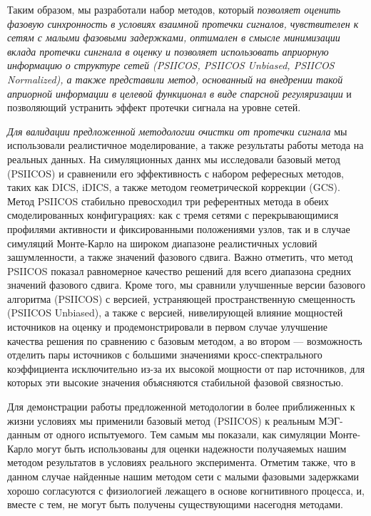 Таким образом, мы разработали набор методов, который \emph{позволяет оценить
    фазовую синхронность в условиях взаимной протечки сигналов, чувствителен к
    сетям с малыми фазовыми задержками, оптимален в смысле минимизации вклада
    протечки сингнала в оценку и позволяет использовать априорную информацию о
    структуре сетей (PSIICOS, PSIICOS Unbiased, PSIICOS Normalized), а также
    представили метод, основанный на внедрении такой априорной информации в
целевой функционал в виде спарсной регуляризации} и позволяющий устранить
эффект протечки сигнала на уровне сетей.

\emph{Для валидации предложенной методологии очистки от протечки сигнала} мы
использовали реалистичное моделирование, а также результаты работы метода на реальных данных.
На симуляционных даннх мы исследовали базовый метод
(PSIICOS) и сравненили его эффективность с набором рефересных методов, таких как
DICS, iDICS, а также методом геометрической коррекции (GCS). Метод PSIICOS
стабильно превосходил три референтных метода в обеих смоделированных
конфигурациях: как с тремя сетями с перекрывающимися профилями активности и
фиксированными положениями узлов, так и в случае симуляций Монте-Карло на
широком диапазоне реалистичных условий зашумленности, а также значений фазового
сдвига.  Важно отметить, что метод PSIICOS показал равномерное качество решений
для всего диапазона средних значений фазового сдвига. Кроме того, мы сравнили
улучшенные версии базового алгоритма (PSIICOS) с версией, устраняющей
пространственную смещенность (PSIICOS Unbiased), а также с версией,
нивелирующей влияние мощностей источников на оценку и продемонстрировали в
первом случае улучшение качества решения по сравнению с базовым методом, а во
втором --- возможность отделить пары  источников с большими значениями
кросс-спектрального коэффициента исключительно из-за их высокой мощности  от
пар источников, для которых эти высокие значения объясняются стабильной фазовой
связностью.

Для демонстрации работы предложенной методологии в более приближенных к жизни
условиях мы применили базовый метод (PSIICOS) к реальным МЭГ-данным от одного
испытуемого.  Тем самым мы показали, как симуляции Монте-Карло могут быть
использованы для оценки надежности получаяемых нашим методом результатов в
условиях реального эксперимента. Отметим также, что в данном случае найденные нашим методом
сети с малыми фазовыми задержками хорошо согласуются с физиологией лежащего в основе когнитивного процесса,
и, вместе с тем, не могут быть получены существующими насегодня методами.

